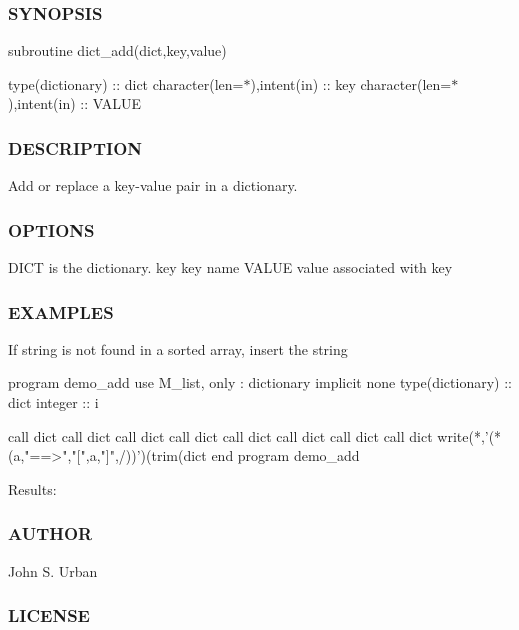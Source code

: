 \subsubsection*{S\+Y\+N\+O\+P\+S\+IS}

subroutine dict\+\_\+add(dict,key,value)

type(dictionary) \+:\+: dict character(len=$\ast$),intent(in) \+:\+: key character(len=$\ast$),intent(in) \+:\+: V\+A\+L\+UE

\subsubsection*{D\+E\+S\+C\+R\+I\+P\+T\+I\+ON}

Add or replace a key-\/value pair in a dictionary.

\subsubsection*{O\+P\+T\+I\+O\+NS}

D\+I\+CT is the dictionary. key key name V\+A\+L\+UE value associated with key

\subsubsection*{E\+X\+A\+M\+P\+L\+ES}

\begin{DoxyVerb}If string is not found in a sorted array, insert the string

 program demo_add
 use M_list, only : dictionary
 implicit none
 type(dictionary) :: dict
 integer          :: i

 call dict%
 call dict%
 call dict%
 call dict%
 call dict%
 call dict%
 call dict%
 call dict%
 write(*,'(*(a,"==>","[",a,"]",/))')(trim(dict%
 end program demo_add

Results:
\end{DoxyVerb}


\subsubsection*{A\+U\+T\+H\+OR}

John S. Urban \subsubsection*{L\+I\+C\+E\+N\+SE}

